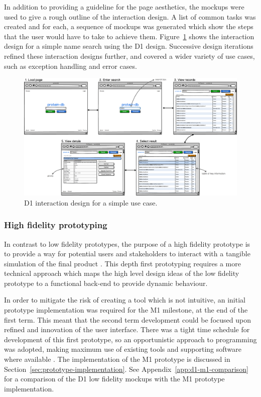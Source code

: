 \newpage
In addition to providing a guideline for the page aesthetics, the
mockups were used to give a rough outline of the interaction design. A
list of common tasks was created and for each, a sequence of mockups
was generated which show the steps that the user would have to take to
achieve them. Figure~\ref{fig:d1-search} shows the interaction design
for a simple name search using the D1 design. Successive design
iterations refined these interaction designs further, and covered a
wider variety of use cases, such as exception handling and error
cases.


\begin{figure}[H]
\centering
    \includegraphics[width=\textwidth]{assets/d1-search}
\caption[D1 interaction design for a simple use case]
        {D1 interaction design for a simple use case.}
\label{fig:d1-search}
\end{figure}


\subsubsection*{High fidelity prototyping}

In contrast to low fidelity prototypes, the purpose of a high fidelity
prototype is to provide a way for potential users and stakeholders to
interact with a tangible simulation of the final product
\cite{egger2000lofi}. This depth first prototyping requires a more
technical approach which maps the high level design ideas of the low
fidelity prototype to a functional back-end to provide dynamic
behaviour.

In order to mitigate the risk of creating a tool which is not
intuitive, an initial prototype implementation was required for the M1
milestone, at the end of the first term. This meant that the second
term development could be focused upon refined and innovation of the
user interface. There was a tight time schedule for development of
this first prototype, so an opportunistic approach to programming was
adopted, making maximum use of existing tools and supporting software
where available \cite{brandt2008opportunistic}. The implementation of
the M1 prototype is discussed in
Section~\ref{sec:prototype-implementation}. See
Appendix~\ref{app:d1-m1-comparison} for a comparison of the D1 low
fidelity mockups with the M1 prototype implementation.
